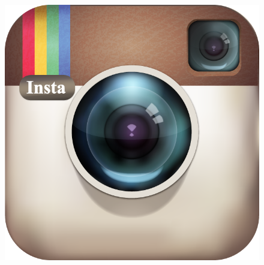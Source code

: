 \documentclass[glossy]{beamer}
\begin{document}
\begin{frame}[fragile=singleslide]
\begin{columns}
\begin{column}{8cm}
      \begin{figure}
        \centering
        
      \end{figure}

      \begin{figure}
        \centering
        \includegraphics[width=0.25\columnwidth]{instagram}
      \end{figure}
    \end{column}
  \end{columns}

\end{frame}
\end{document}
